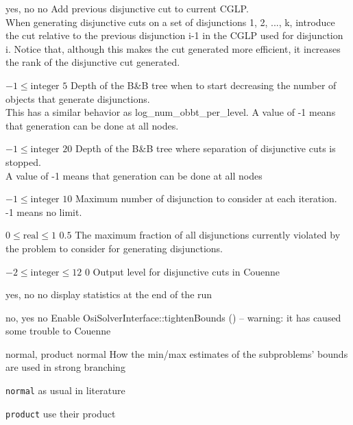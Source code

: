 %
{yes, no}%
{no}%
{Add previous disjunctive cut to current CGLP.\\
When generating disjunctive cuts on a set of disjunctions 1, 2, ..., k, introduce the cut relative to the previous disjunction i-1 in the CGLP used for disjunction i. Notice that, although this makes the cut generated more efficient, it increases the rank of the disjunctive cut generated.}%
{}

%
{$-1\leq\textrm{integer}$}%
{$5$}%
{Depth of the B\&B tree when to start decreasing the number of objects that generate disjunctions.\\
This has a similar behavior as log\_num\_obbt\_per\_level. A value of -1 means that generation can be done at all nodes.}%
{}

%
{$-1\leq\textrm{integer}$}%
{$20$}%
{Depth of the B\&B tree where separation of disjunctive cuts is stopped.\\
A value of -1 means that generation can be done at all nodes}%
{}

%
{$-1\leq\textrm{integer}$}%
{$10$}%
{Maximum number of disjunction to consider at each iteration.\\
-1 means no limit.}%
{}

%
{$0\leq\textrm{real}\leq1$}%
{$0.5$}%
{The maximum fraction of all disjunctions currently violated by the problem to consider for generating disjunctions.}%
{}

%
{$-2\leq\textrm{integer}\leq12$}%
{$0$}%
{Output level for disjunctive cuts in Couenne}%
{}

%
{yes, no}%
{no}%
{display statistics at the end of the run}%
{}

%
{no, yes}%
{no}%
{Enable OsiSolverInterface::tightenBounds () -- warning: it has caused some trouble to Couenne}%
{}

%
{normal, product}%
{normal}%
{How the min/max estimates of the subproblems' bounds are used in strong branching}%
{\begin{list}{}{
\setlength{\parsep}{0em}
\setlength{\leftmargin}{5ex}
\setlength{\labelwidth}{2ex}
\setlength{\itemindent}{0ex}
\setlength{\topsep}{0pt}}
\item[\texttt{normal}] as usual in literature
\item[\texttt{product}] use their product
\end{list}
}

